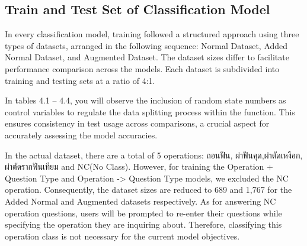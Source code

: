 \documentclass[12pt,oneside,openright,a4paper]{cpe-english-project}
\begin{document}
    \subsection{Train and Test Set of Classification Model}
      \qquad In every classification model, training followed a structured approach using three types of datasets, arranged in the following sequence: Normal Dataset, Added Normal Dataset, and Augmented Dataset. The dataset sizes differ to facilitate performance comparison across the models. Each dataset is subdivided into training and testing sets at a ratio of 4:1. \par
      \qquad In tables 4.1 – 4.4, you will observe the inclusion of random state numbers as control variables to regulate the data splitting process within the function. This ensures consistency in test usage across comparisons, a crucial aspect for accurately assessing the model accuracies. \par
      \qquad In the actual dataset, there are a total of 5 operations: \textthai{ถอนฟัน, ผ่าฟันคุด,ผ่าตัดเหงือก, ผ่าตัดรากฟันเทียม} and NC(No Class). However, for training the Operation + Question Type and Operation -> Question Type models, we excluded the NC operation. Consequently, the dataset sizes are reduced to 689 and 1,767 for the Added Normal and Augmented datasets respectively. As for answering NC operation questions, users will be prompted to re-enter their questions while specifying the operation they are inquiring about. Therefore, classifying this operation class is not necessary for the current model objectives. \par
      \begin{table}
        \centering
        \caption{Train and Test Set of Normal and Augmented Dataset Training With Operation+Q1 and Operation+Q2 Classification model}
      \end{table}
\end{document}
